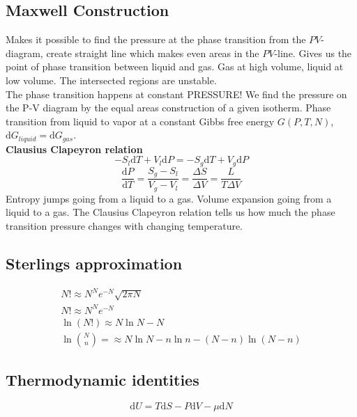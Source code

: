 \documentclass[a4paper, norsk, 8pt]{article}
\begin{document}
\begin{multicols*}{3}
\subsection*{\footnotesize Maxwell Construction}
Makes it possible to find the pressure at the phase transition from the $PV$-diagram, create straight line which makes even areas in the $PV$-line. Gives us the point of phase transition between liquid and gas. Gas at high volume, liquid at low volume. The intersected regions are unstable.\\
The phase transition happens at constant PRESSURE! We find the pressure on the P-V diagram by the equal areas construction of a given isotherm. Phase transition from liquid to vapor at a constant Gibbs free energy $G(P, T, N)$, $\mbox{d}G_{liquid} = \mbox{d}G_{gas}$.\\
\textbf{Clausius Clapeyron relation}
$$-S_l\mbox{d}T + V_l\mbox{d}P = -S_g\mbox{d}T+V_g\mbox{d}P $$
$$ \frac{\mbox{d}P}{\mbox{d}T} = \frac{S_g-S_l}{V_g-V_l} = \frac{\Delta S}{\Delta V} = \frac{L}{T\Delta V}$$
Entropy jumps going from a liquid to a gas. Volume expansion going from a liquid to a gas. The Clausius Clapeyron relation tells us how much the phase transition pressure changes with changing temperature.

\subsection*{\footnotesize  Sterlings approximation}
\begin{align*}
  N! \approx N^Ne^{-N}\sqrt{2\pi N} \\
  N! \approx N^Ne^{-N} \\
  \ln{(N!)} \approx N\ln{N}-N \\
  \ln{\binom{N}{n}} = \approx N\ln{N}-n\ln{n}-(N-n)\ln{\left(N-n\right)}
\end{align*}

\subsection*{\footnotesize  Thermodynamic identities}
\begin{equation}
    \mbox{d}U = T\mbox{d}S -P\mbox{d}V - \mu\mbox{d}N
\end{equation}


\end{multicols*}
\end{document}
